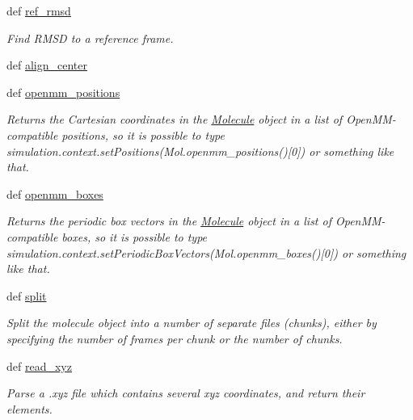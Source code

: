 \begin{DoxyCompactItemize}
def \hyperlink{classforcebalance_1_1molecule_1_1Molecule_a58191a79257fbad7f2c636239bfa7596}{ref\-\_\-rmsd}
\begin{DoxyCompactList}\small\item\em \-Find \-R\-M\-S\-D to a reference frame. \end{DoxyCompactList}\item 
def \hyperlink{classforcebalance_1_1molecule_1_1Molecule_aff7a0e2413297088a5bc3e91e5951f3f}{align\-\_\-center}
\item 
def \hyperlink{classforcebalance_1_1molecule_1_1Molecule_a57edc8d72f7e4c1a1452de7b438f3c55}{openmm\-\_\-positions}
\begin{DoxyCompactList}\small\item\em \-Returns the \-Cartesian coordinates in the \hyperlink{classforcebalance_1_1molecule_1_1Molecule}{\-Molecule} object in a list of \-Open\-M\-M-\/compatible positions, so it is possible to type simulation.\-context.\-set\-Positions(\-Mol.\-openmm\-\_\-positions()\mbox{[}0\mbox{]}) or something like that. \end{DoxyCompactList}\item 
def \hyperlink{classforcebalance_1_1molecule_1_1Molecule_aa20a420f4b450bfa9e632fae037ecb01}{openmm\-\_\-boxes}
\begin{DoxyCompactList}\small\item\em \-Returns the periodic box vectors in the \hyperlink{classforcebalance_1_1molecule_1_1Molecule}{\-Molecule} object in a list of \-Open\-M\-M-\/compatible boxes, so it is possible to type simulation.\-context.\-set\-Periodic\-Box\-Vectors(\-Mol.\-openmm\-\_\-boxes()\mbox{[}0\mbox{]}) or something like that. \end{DoxyCompactList}\item 
def \hyperlink{classforcebalance_1_1molecule_1_1Molecule_a71da1c1e530afd8b9b5f08d9bd27259f}{split}
\begin{DoxyCompactList}\small\item\em \-Split the molecule object into a number of separate files (chunks), either by specifying the number of frames per chunk or the number of chunks. \end{DoxyCompactList}\item 
def \hyperlink{classforcebalance_1_1molecule_1_1Molecule_a15a7a0e0377e6dfd52e60c77fbc583c1}{read\-\_\-xyz}
\begin{DoxyCompactList}\small\item\em \-Parse a .xyz file which contains several xyz coordinates, and return their elements. \end{DoxyCompactList}\item 

\end{DoxyCompactItemize}
